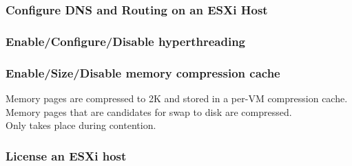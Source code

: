 \subsubsection{Configure DNS and Routing on an ESXi Host}

\subsubsection{Enable/Configure/Disable hyperthreading}

\subsubsection{Enable/Size/Disable memory compression cache}

Memory pages are compressed to 2K and stored in a per-VM compression cache.\\

Memory pages that are candidates for swap to disk are compressed.\\

Only takes place during contention.

\subsubsection{License an ESXi host}
